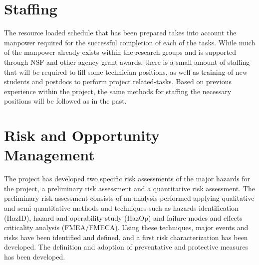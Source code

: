 



\section{Staffing}

The resource loaded schedule that has been prepared takes into account the manpower required for the successful completion of each of the tasks.  While much of the manpower already exists within the research groups and is supported through NSF and other agency grant awards, there is a small amount of staffing that will be required to fill some technician positions, as well as training of new students and postdocs to perform project related-tasks.  Based on previous experience within the project, the same methods for staffing the necessary positions will be followed as in the past.  




\section{Risk and Opportunity Management}

The project has developed two specific risk assessments of the major hazards for the project, a preliminary risk assessment and a quantitative risk assessment.  The preliminary risk assessment consists of an analysis performed applying qualitative and semi-quantitative methods and techniques such as hazards identification (HazID), hazard and operability study (HazOp) and failure modes and effects criticality analysis (FMEA/FMECA).  Using these techniques, major events and risks have been identified and defined, and a first risk characterization has been developed.  The definition and adoption of preventative and protective measures has been developed.

